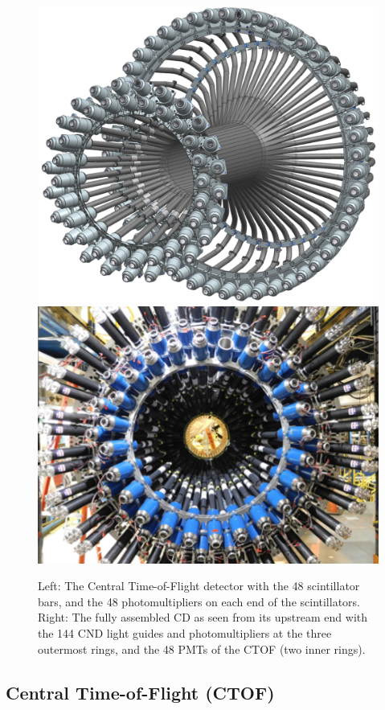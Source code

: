 \documentclass[final,3p,twocolumn]{elsarticle}
\begin{document}
\begin{figure}[htbp!]
\hspace{-0.3cm}\centerline{\includegraphics[width=1.1\columnwidth]{ctof-design.png}
\hspace{0.3cm}\includegraphics[angle=90,width=0.8\columnwidth]{cnd-ctof.png}}
\caption{Left: The Central Time-of-Flight detector with the 48 scintillator bars, and the 48 photomultipliers on each end
of the scintillators. Right: The fully assembled CD as seen from its upstream end with the 144 CND light guides and
photomultipliers at the three outermost rings, and the 48 PMTs of the CTOF (two inner rings). } 
\label{ctof-cnd}
\end{figure} 

\subsection{Central Time-of-Flight (CTOF)}
\end{document}
